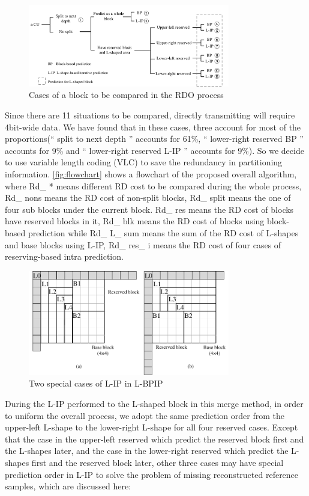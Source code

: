\documentclass[journal]{IEEEtran}
\begin{document}
\begin{figure}[htpb]
\centering
\includegraphics[width=8.8cm]{pictures/eleven cases}
\caption{Cases of a block to be compared in the RDO process}
\label{fig:eleven}
\end{figure}

Since there are 11 situations to be compared, directly transmitting will require 4bit-wide data. We have found that in these cases, three  account for most of the proportions(“ split to next depth ” accounts for 61\%, “ lower-right reserved BP ” accounts for 9\% and “ lower-right reserved L-IP ” accounts for 9\%). So we decide to use variable length coding (VLC) to save the redundancy in partitioning information. \autoref{fig:flowchart} shows a flowchart of the proposed overall algorithm, where Rd\_ * means different RD cost to be compared during the whole process, Rd\_ nons means the RD cost of non-split blocks, Rd\_ split means the one of four sub blocks under the current block. Rd\_ res means the RD cost of blocks have reserved blocks in it, Rd\_ blk means the RD cost of blocks using block-based prediction while Rd\_ L\_ sum means the sum of the RD cost of L-shapes and base blocks using L-IP, Rd\_ res\_ i means the RD cost of four cases of reserving-based intra prediction.


\begin{figure}[htpb]
\centering
\includegraphics[width=8.8cm]{pictures/special}
\caption{Two special cases of L-IP in L-BPIP}
\label{fig:special}
\end{figure}

During the L-IP performed to the L-shaped block in this merge method, in order to uniform the overall process, we adopt the same prediction order from the upper-left L-shape to the lower-right L-shape for all four reserved cases. Except that the case in the upper-left reserved which predict the reserved block first and the L-shapes later, and the case in the lower-right reserved which predict the L-shapes first and the reserved block later, other three cases may have special prediction order in L-IP to solve the problem of missing reconstructed reference samples, which are discussed here:
\end{document}
